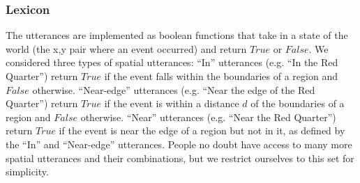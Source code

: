 \documentclass[10pt,letterpaper]{article}
\newcommand\tab[1][0.5cm]{\hspace*{#1}}
\begin{document}
%

\subsubsection{Lexicon} The utterances are implemented as boolean functions that take in a state of the world (the x,y pair where an event occurred) and return $True$ or $False$. We considered three types of spatial utterances: ``In'' utterances (e.g. ``In the Red Quarter'') return $True$ if the event falls within the boundaries of a region and $False$ otherwise. ``Near-edge'' utterances (e.g. ``Near the edge of the Red Quarter'') return $True$ if the event is within a distance $d$ of the boundaries of a region and $False$ otherwise. ``Near'' utterances (e.g. ``Near the Red Quarter'') return $True$ if the event is near the edge of a region but not in it, as defined by the ``In'' and ``Near-edge'' utterances. People no doubt have access to many more spatial utterances and their combinations, but we restrict ourselves to this set for simplicity. 
\end{document}
